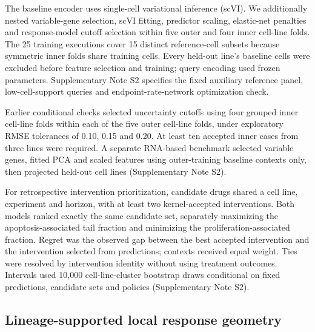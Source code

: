 \documentclass[a4paper,fleqn]{cas-sc}
\makeatletter
\DeclareRobustCommand{\rev}[1]{{\color{red}\def\@citecolor{black}\def\@linkcolor{red}\def\@urlcolor{red}#1}}
\let\unmarkedcite\cite
\renewcommand{\cite}[1]{{\color{black}\def\@citecolor{black}\unmarkedcite{#1}}}
\makeatother
\begin{document}
The baseline encoder uses single-cell variational inference (scVI).\cite{lopez2018scvi} We additionally nested variable-gene selection, scVI fitting, predictor scaling, elastic-net penalties and response-model cutoff selection within five outer and four inner cell-line folds. The 25 training executions cover 15 distinct reference-cell subsets because symmetric inner folds share training cells. Every held-out line's baseline cells were excluded before feature selection and training; query encoding used frozen parameters. Supplementary Note S2 specifies the fixed auxiliary reference panel, low-cell-support queries and endpoint-rate-network optimization check.

Earlier conditional checks selected uncertainty cutoffs using four grouped inner cell-line folds within each of the five outer cell-line folds, under exploratory RMSE tolerances of 0.10, 0.15 and 0.20. At least ten accepted inner cases from three lines were required. A separate RNA-based benchmark selected variable genes, fitted PCA and scaled features using outer-training baseline contexts only, then projected held-out cell lines (Supplementary Note S2).

\rev{For retrospective intervention prioritization, candidate drugs shared a cell line, experiment and horizon, with at least two kernel-accepted interventions.} \rev{Both models ranked exactly the same candidate set, separately maximizing the apoptosis-associated tail fraction and minimizing the proliferation-associated fraction.} \rev{Regret was the observed gap between the best accepted intervention and the intervention selected from predictions; contexts received equal weight.} \rev{Ties were resolved by intervention identity without using treatment outcomes.} \rev{Intervals used 10,000 cell-line-cluster bootstrap draws conditional on fixed predictions, candidate sets and policies (Supplementary Note S2).}

\subsection*{Lineage-supported local response geometry}
\end{document}
